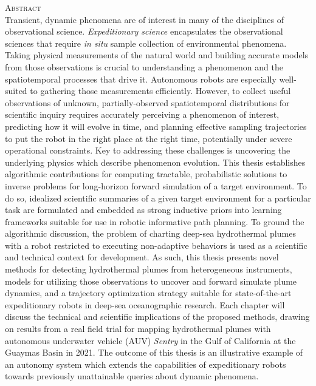     \begin{singlespace}
    {\parindent0pt 
        {\large \textsc{Abstract}} \\ %
    
        Transient, dynamic phenomena are of interest in many of the disciplines of observational science. \emph{Expeditionary science} encapsulates the observational sciences that require \emph{in situ} sample collection of environmental phenomena.
        Taking physical measurements of the natural world and building accurate models from those observations is crucial to understanding a phenomenon and the spatiotemporal processes that drive it. Autonomous robots are especially well-suited to gathering those measurements efficiently.
        However, to collect useful observations of unknown, partially-observed spatiotemporal distributions for scientific inquiry requires accurately perceiving a phenomenon of interest, predicting how it will evolve in time, and planning effective sampling trajectories to put the robot in the right place at the right time, potentially under severe operational constraints.
        Key to addressing these challenges is uncovering the underlying physics which describe phenomenon evolution.
        This thesis establishes algorithmic contributions for computing tractable, probabilistic  solutions to inverse problems for long-horizon forward simulation of a target environment.
        To do so, idealized scientific summaries of a given target environment for a particular task are formulated and embedded as strong inductive priors into learning frameworks suitable for use in robotic informative path planning.
        To ground the algorithmic discussion, the problem of charting deep-sea hydrothermal plumes with a robot restricted to executing non-adaptive behaviors is used as a scientific and technical context for development.
        As such, this thesis presents novel methods for detecting hydrothermal plumes from heterogeneous instruments, models for utilizing those observations to uncover and forward simulate plume dynamics, and a trajectory optimization strategy suitable for state-of-the-art expeditionary robots in deep-sea oceanographic research.
        Each chapter will discuss the technical and scientific implications of the proposed methods, drawing on results from a real field trial for mapping hydrothermal plumes with autonomous underwater vehicle (AUV) \emph{Sentry} in the Gulf of California at the Guaymas Basin in 2021.
        The outcome of this thesis is an illustrative example of an autonomy system which extends the capabilities of expeditionary robots towards previously unattainable queries about dynamic phenomena.\\
    }
    

\end{singlespace}
